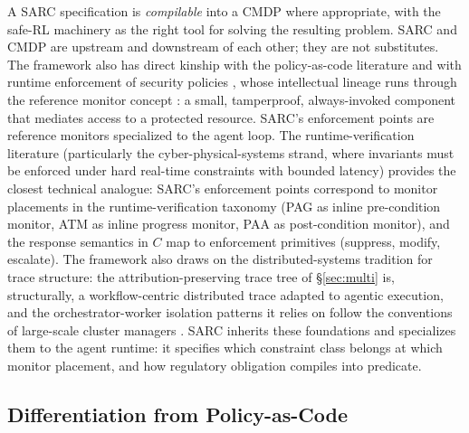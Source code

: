 \documentclass[11pt,a4paper]{article}
\theoremstyle{remark}
\begin{document}
A SARC specification is \emph{compilable} into a CMDP where appropriate, with the safe-RL machinery as the right tool for solving the resulting problem. SARC and CMDP are upstream and downstream of each other; they are not substitutes. The framework also has direct kinship with the policy-as-code literature \cite{jin2017opa,baier2024policymachine} and with runtime enforcement of security policies \cite{schneider2003enforcement,fournet2003stack}, whose intellectual lineage runs through the reference monitor concept \cite{anderson1972security,lampson1971protection}: a small, tamperproof, always-invoked component that mediates access to a protected resource. SARC's enforcement points are reference monitors specialized to the agent loop. The runtime-verification literature \cite{leucker2009runtime,falcone2018taxonomy,bartocci2018runtime} (particularly the cyber-physical-systems strand, where invariants must be enforced under hard real-time constraints with bounded latency) provides the closest technical analogue: SARC's enforcement points correspond to monitor placements in the runtime-verification taxonomy (PAG as inline pre-condition monitor, ATM as inline progress monitor, PAA as post-condition monitor), and the response semantics in $C$ map to enforcement primitives (suppress, modify, escalate). The framework also draws on the distributed-systems tradition for trace structure: the attribution-preserving trace tree of \S\ref{sec:multi} is, structurally, a workflow-centric distributed trace \cite{sigelman2010dapper,sambasivan2016diagnosing} adapted to agentic execution, and the orchestrator-worker isolation patterns it relies on follow the conventions of large-scale cluster managers \cite{burns2016borg}. SARC inherits these foundations and specializes them to the agent runtime: it specifies which constraint class belongs at which monitor placement, and how regulatory obligation compiles into predicate.

\subsection{Differentiation from Policy-as-Code}\label{sec:vs-pac}
\end{document}
